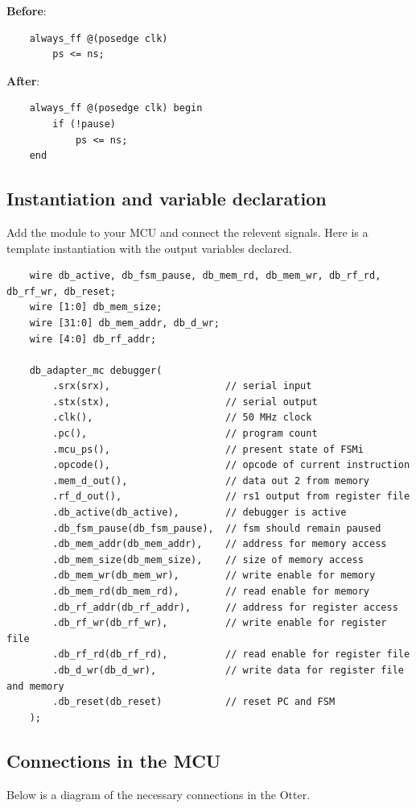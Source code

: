 \documentclass[10pt,a4paper]{article}
\begin{document}
\medskip
\noindent\textbf{Before}:
\begin{verbatim}
    always_ff @(posedge clk)
        ps <= ns;
\end{verbatim}

\noindent\textbf{After}:
\begin{verbatim}
    always_ff @(posedge clk) begin
        if (!pause)
            ps <= ns;
    end
\end{verbatim}

\newpage
\subsection{Instantiation and variable declaration}
Add the module to your MCU and connect the relevent signals. Here is a template instantiation
with the output variables declared.

\begin{verbatim}
    wire db_active, db_fsm_pause, db_mem_rd, db_mem_wr, db_rf_rd, db_rf_wr, db_reset;
    wire [1:0] db_mem_size;
    wire [31:0] db_mem_addr, db_d_wr;
    wire [4:0] db_rf_addr;

    db_adapter_mc debugger(
        .srx(srx),                    // serial input
        .stx(stx),                    // serial output
        .clk(),                       // 50 MHz clock 
        .pc(),                        // program count
        .mcu_ps(),                    // present state of FSMi
        .opcode(),                    // opcode of current instruction
        .mem_d_out(),                 // data out 2 from memory
        .rf_d_out(),                  // rs1 output from register file
        .db_active(db_active),        // debugger is active
        .db_fsm_pause(db_fsm_pause),  // fsm should remain paused
        .db_mem_addr(db_mem_addr),    // address for memory access
        .db_mem_size(db_mem_size),    // size of memory access
        .db_mem_wr(db_mem_wr),        // write enable for memory
        .db_mem_rd(db_mem_rd),        // read enable for memory
        .db_rf_addr(db_rf_addr),      // address for register access
        .db_rf_wr(db_rf_wr),          // write enable for register file
        .db_rf_rd(db_rf_rd),          // read enable for register file
        .db_d_wr(db_d_wr),            // write data for register file and memory
        .db_reset(db_reset)           // reset PC and FSM
    );
\end{verbatim}

\newpage
\subsection{Connections in the MCU}
Below is a diagram of the necessary connections in the Otter.
\end{document}

